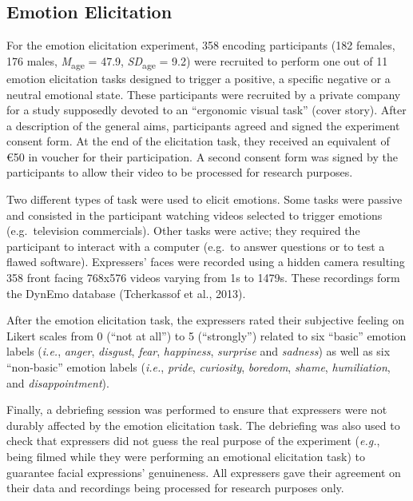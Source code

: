 \documentclass[
  english,
  man]{apa7}
\begin{document}
\hypertarget{emotion-elicitation}{%
\subsection{Emotion Elicitation}\label{emotion-elicitation}}

For the emotion elicitation experiment, 358 encoding participants (182 females, 176 males, \emph{M}\textsubscript{age} = 47.9, \emph{SD}\textsubscript{age} = 9.2) were recruited to perform one out of 11 emotion elicitation tasks designed to trigger a positive, a specific negative or a neutral emotional state. These participants were recruited by a private company for a study supposedly devoted to an ``ergonomic visual task'' (cover story). After a description of the general aims, participants agreed and signed the experiment consent form. At the end of the elicitation task, they received an equivalent of €50 in voucher for their participation. A second consent form was signed by the participants to allow their video to be processed for research purposes.

Two different types of task were used to elicit emotions. Some tasks were passive and consisted in the participant watching videos selected to trigger emotions (e.g.~television commercials). Other tasks were active; they required the participant to interact with a computer (e.g.~to answer questions or to test a flawed software). Expressers' faces were recorded using a hidden camera resulting 358 front facing 768x576 videos varying from 1s to 1479s. These recordings form the DynEmo database (Tcherkassof et al., 2013).

After the emotion elicitation task, the expressers rated their subjective feeling on Likert scales from 0 (``not at all'') to 5 (``strongly'') related to six ``basic'' emotion labels (\emph{i.e.}, \emph{anger}, \emph{disgust}, \emph{fear}, \emph{happiness}, \emph{surprise} and \emph{sadness}) as well as six ``non-basic'' emotion labels (\emph{i.e.}, \emph{pride}, \emph{curiosity}, \emph{boredom}, \emph{shame}, \emph{humiliation}, and \emph{disappointment}).

Finally, a debriefing session was performed to ensure that expressers were not durably affected by the emotion elicitation task. The debriefing was also used to check that expressers did not guess the real purpose of the experiment (\emph{e.g.}, being filmed while they were performing an emotional elicitation task) to guarantee facial expressions' genuineness. All expressers gave their agreement on their data and recordings being processed for research purposes only.
\end{document}
